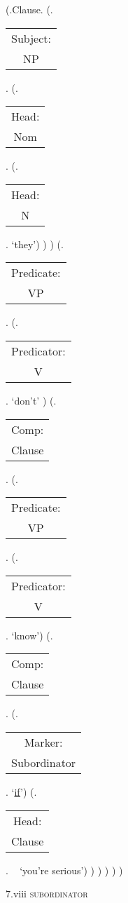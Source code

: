 \documentclass[12pt,letterpaper]{article}
\begin{document}
\begin{figure}
	\begin{center}
		\begin{parsetree}
			
			(.Clause.
			(.\begin{tabular}{c}Subject:\\NP\end{tabular}.
			(.\begin{tabular}{c}Head:\\Nom\end{tabular}.
			(.\begin{tabular}{c}Head:\\N\end{tabular}. `they')
			)
			)
			(.\begin{tabular}{c}Predicate:\\VP\end{tabular}.
			(.\begin{tabular}{c}Predicator:\\V\end{tabular}. `{don't}' )
			(.\begin{tabular}{c}Comp:\\Clause\end{tabular}.
			(.\begin{tabular}{c}Predicate:\\VP\end{tabular}. 
			(.\begin{tabular}{c}Predicator:\\V\end{tabular}. `know')
			(.\begin{tabular}{c}Comp:\\Clause\end{tabular}.
			(.\begin{tabular}{c}Marker:\\Subordinator\end{tabular}. `\underline{if}')
			(.\begin{tabular}{c}Head:\\Clause\end{tabular}. ~ `{you're serious}')
			)
			)
			)
			)
			)
			
			\hfill \break\hfill \break
		\end{parsetree}
		7.viii \textsc{subordinator}
	\end{center}
\end{figure}
\end{document}
